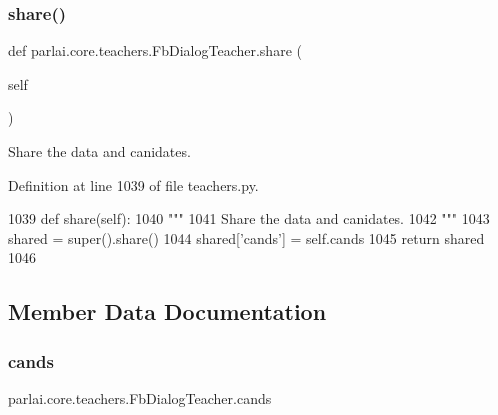 \mbox{\label{classparlai_1_1core_1_1teachers_1_1FbDialogTeacher_a18a4ea7a7f21eeed7e087cb447a37c5a}} 
\subsubsection{\texorpdfstring{share()}{share()}}
{\footnotesize\ttfamily def parlai.\+core.\+teachers.\+Fb\+Dialog\+Teacher.\+share (\begin{DoxyParamCaption}\item[{}]{self }\end{DoxyParamCaption})}

\begin{DoxyVerb}Share the data and canidates.
\end{DoxyVerb}
 

Definition at line 1039 of file teachers.\+py.


\begin{DoxyCode}
1039     \textcolor{keyword}{def }share(self):
1040         \textcolor{stringliteral}{"""}
1041 \textcolor{stringliteral}{        Share the data and canidates.}
1042 \textcolor{stringliteral}{        """}
1043         shared = super().share()
1044         shared[\textcolor{stringliteral}{'cands'}] = self.cands
1045         \textcolor{keywordflow}{return} shared
1046 
\end{DoxyCode}


\subsection{Member Data Documentation}
\mbox{\label{classparlai_1_1core_1_1teachers_1_1FbDialogTeacher_a3ec67545250d8a877038667e3f4ea158}} 
\subsubsection{\texorpdfstring{cands}{cands}}
{\footnotesize\ttfamily parlai.\+core.\+teachers.\+Fb\+Dialog\+Teacher.\+cands}



